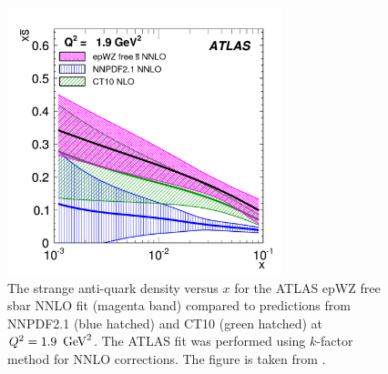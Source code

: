 \begin{itemize}
\begin{figure}[!ht]
  \centering
  \includegraphics[width=8cm]{atlas.pdf}
  \caption{The strange anti-quark density versus $x$ for the ATLAS
    epWZ free sbar NNLO fit (magenta band) compared to predictions
    from NNPDF2.1 (blue hatched) and CT10 (green hatched) 
    at $Q^2 = 1.9\ \,\text{Ge\hspace{-.08em}V}^2$. The ATLAS fit was performed using $k$-factor method 
    for NNLO corrections. The figure is taken from \cite{atlas:strange}.}
  \label{fig:atlas}
\end{figure}


\end{itemize}
